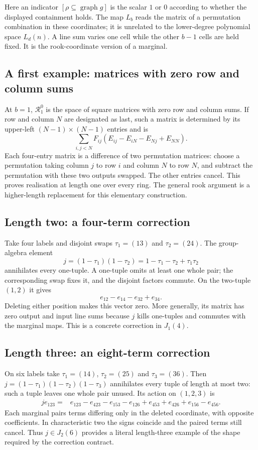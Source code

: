 Here an indicator $[\rho\subseteq\operatorname{graph}g]$ is the
scalar $1$ or $0$ according to whether the displayed containment
holds. The map $L_b$ reads the matrix of a permutation combination
in these coordinates; it is unrelated to the lower-degree polynomial
space $L_d(n)$. A line sum varies one cell while the other $b-1$
cells are held fixed. It is the rook-coordinate version of a marginal.

\subsection{A first example: matrices with zero row and column sums}
At $b=1$, $\mathcal R_1^{0}$ is the space of square matrices with zero row and column sums. If row and column $N$ are designated as last, such a matrix is determined by its upper-left $(N-1)\times(N-1)$ entries and is
\[\sum_{i,j<N}F_{ij}(E_{ij}-E_{iN}-E_{Nj}+E_{NN}).
\]
Each four-entry matrix is a difference of two permutation matrices: choose a permutation taking column $j$ to row $i$ and column $N$ to row $N$, and subtract the permutation with these two outputs swapped. The other entries cancel. This proves realisation at length one over every ring. The general rook argument is a higher-length replacement for this elementary construction.

\subsection{Length two: a four-term correction}
Take four labels and disjoint swaps $\tau_1=(13)$ and $\tau_2=(24)$.
The group-algebra element
\[
                  j=(1-\tau_1)(1-\tau_2)
                    =1-\tau_1-\tau_2+\tau_1\tau_2
\]
annihilates every one-tuple. A one-tuple omits at least one whole
pair; the corresponding swap fixes it, and the disjoint factors
commute. On the two-tuple $(1,2)$ it gives
\[
                       e_{12}-e_{14}-e_{32}+e_{34}.
\]
Deleting either position makes this vector zero. More generally,
its matrix has zero output and input line sums because $j$ kills
one-tuples and commutes with the marginal maps. This is a concrete
correction in $J_1(4)$.

\subsection{Length three: an eight-term correction}
On six labels take $\tau_1=(14)$, $\tau_2=(25)$ and $\tau_3=(36)$.
Then $j=(1-\tau_1)(1-\tau_2)(1-\tau_3)$ annihilates every tuple
of length at most two: such a tuple leaves one whole pair unused.
Its action on $(1,2,3)$ is
\begin{align*}
 j e_{123}={}&e_{123}-e_{423}-e_{153}-e_{126}
                  +e_{453}+e_{426}+e_{156}-e_{456}.
\end{align*}
Each marginal pairs terms differing only in the deleted coordinate,
with opposite coefficients. In characteristic two the signs coincide
and the paired terms still cancel. Thus $j\in J_2(6)$ provides a
literal length-three example of the shape required by the correction
contract.

